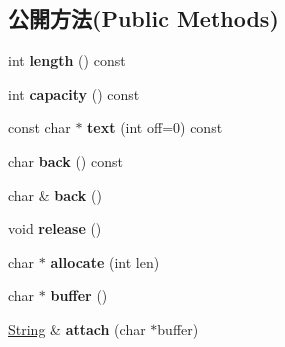 \subsection*{公開方法(Public Methods)}
\begin{DoxyCompactItemize}
\item 
int {\bfseries length} () const \hypertarget{class_i_dream_sky_1_1_string_a95e2c755f8c52acb806208bd6d8b4ad1}{}\label{class_i_dream_sky_1_1_string_a95e2c755f8c52acb806208bd6d8b4ad1}

\item 
int {\bfseries capacity} () const \hypertarget{class_i_dream_sky_1_1_string_a13bda33c5eb12f7439825e1a487bb33c}{}\label{class_i_dream_sky_1_1_string_a13bda33c5eb12f7439825e1a487bb33c}

\item 
const char $\ast$ {\bfseries text} (int off=0) const \hypertarget{class_i_dream_sky_1_1_string_a7f8ee81d4cfb09a1712c4983dc017f04}{}\label{class_i_dream_sky_1_1_string_a7f8ee81d4cfb09a1712c4983dc017f04}

\item 
char {\bfseries back} () const \hypertarget{class_i_dream_sky_1_1_string_adb00060f2043c5efab6df3d1a964f9ad}{}\label{class_i_dream_sky_1_1_string_adb00060f2043c5efab6df3d1a964f9ad}

\item 
char \& {\bfseries back} ()\hypertarget{class_i_dream_sky_1_1_string_abb80e1189595b12b7466d7e38bde3b7c}{}\label{class_i_dream_sky_1_1_string_abb80e1189595b12b7466d7e38bde3b7c}

\item 
void {\bfseries release} ()\hypertarget{class_i_dream_sky_1_1_string_a43f7872d2ca7c8cd9c324660afd515d3}{}\label{class_i_dream_sky_1_1_string_a43f7872d2ca7c8cd9c324660afd515d3}

\item 
char $\ast$ {\bfseries allocate} (int len)\hypertarget{class_i_dream_sky_1_1_string_a0df26a4f4cb9975ce4b5d8a478964359}{}\label{class_i_dream_sky_1_1_string_a0df26a4f4cb9975ce4b5d8a478964359}

\item 
char $\ast$ {\bfseries buffer} ()\hypertarget{class_i_dream_sky_1_1_string_a4cb59a008413463710900cc40ff8c5f6}{}\label{class_i_dream_sky_1_1_string_a4cb59a008413463710900cc40ff8c5f6}

\item 
\hyperlink{class_i_dream_sky_1_1_string}{String} \& {\bfseries attach} (char $\ast$buffer)\hypertarget{class_i_dream_sky_1_1_string_a9cc5f31feb19a3b9813926a769d1da99}{}\label{class_i_dream_sky_1_1_string_a9cc5f31feb19a3b9813926a769d1da99}


\end{DoxyCompactItemize}
